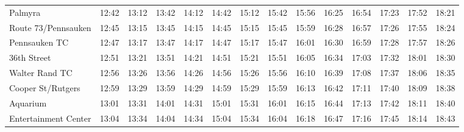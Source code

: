 \begin{center}
\begin{tabular}{@{}lrrrrrrrrrrrrr@{}}
Palmyra & 12:42 & 13:12 & 13:42 & 14:12 & 14:42 & 15:12 & 15:42 & 15:56 & 16:25 & 16:54 & 17:23 & 17:52 & 18:21 \\
Route 73/Pennsauken & 12:45 & 13:15 & 13:45 & 14:15 & 14:45 & 15:15 & 15:45 & 15:59 & 16:28 & 16:57 & 17:26 & 17:55 & 18:24 \\
Pennsauken TC & 12:47 & 13:17 & 13:47 & 14:17 & 14:47 & 15:17 & 15:47 & 16:01 & 16:30 & 16:59 & 17:28 & 17:57 & 18:26 \\
36th Street & 12:51 & 13:21 & 13:51 & 14:21 & 14:51 & 15:21 & 15:51 & 16:05 & 16:34 & 17:03 & 17:32 & 18:01 & 18:30 \\
Walter Rand TC & 12:56 & 13:26 & 13:56 & 14:26 & 14:56 & 15:26 & 15:56 & 16:10 & 16:39 & 17:08 & 17:37 & 18:06 & 18:35 \\
Cooper St/Rutgers & 12:59 & 13:29 & 13:59 & 14:29 & 14:59 & 15:29 & 15:59 & 16:13 & 16:42 & 17:11 & 17:40 & 18:09 & 18:38 \\
Aquarium & 13:01 & 13:31 & 14:01 & 14:31 & 15:01 & 15:31 & 16:01 & 16:15 & 16:44 & 17:13 & 17:42 & 18:11 & 18:40 \\
Entertainment Center & 13:04 & 13:34 & 14:04 & 14:34 & 15:04 & 15:34 & 16:04 & 16:18 & 16:47 & 17:16 & 17:45 & 18:14 & 18:43 \\
\bottomrule\end{tabular}\end{center}

